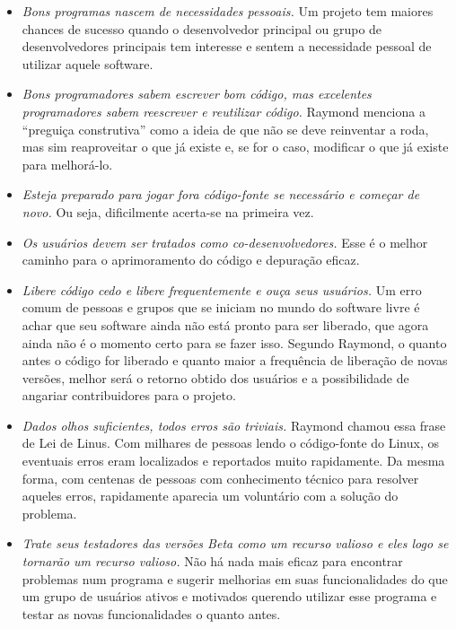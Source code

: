 \begin{itemize}

\item \emph{Bons programas nascem de necessidades pessoais.} Um projeto tem maiores chances de sucesso
    quando o desenvolvedor principal ou grupo de desenvolvedores principais tem interesse e sentem
    a necessidade pessoal de utilizar aquele software.

\item \emph{Bons programadores sabem escrever bom código, mas excelentes
    programadores sabem reescrever e reutilizar código.} Raymond menciona a ``preguiça construtiva''
    como a ideia de que não se deve reinventar a roda, mas sim reaproveitar o que já existe e,
    se for o caso, modificar o que já existe para melhorá-lo.

\item \emph{Esteja preparado para jogar fora código-fonte se necessário e começar de novo.} 
	Ou seja, dificilmente acerta-se na primeira vez.

\item \emph{Os usuários devem ser tratados como co-desenvolvedores.} Esse é o melhor caminho para 
    o aprimoramento do código e depuração eficaz.

\item \emph{Libere código cedo e libere frequentemente e ouça seus usuários.}
	Um erro comum de pessoas e grupos que se 
	iniciam no mundo do software livre é achar que seu software ainda não está pronto para ser
	liberado, que agora ainda não é o momento certo para se fazer isso. Segundo Raymond, o quanto
	antes o código for liberado e quanto maior a frequência de liberação de novas versões, melhor
	será o retorno obtido dos usuários e a possibilidade de angariar contribuidores para o projeto.

\item \emph{Dados olhos suficientes, todos erros são triviais.} Raymond chamou essa frase de Lei de Linus.
    Com milhares de pessoas lendo o código-fonte do Linux, os eventuais erros eram localizados e
    reportados muito rapidamente. Da mesma forma, com centenas de pessoas com conhecimento técnico
    para resolver aqueles erros, rapidamente aparecia um voluntário com a solução do problema.

\item \emph{Trate seus testadores das versões Beta como um recurso valioso e eles logo se tornarão
	um recurso valioso.} Não há nada mais eficaz para encontrar problemas num programa e sugerir
	melhorias em suas funcionalidades do que um grupo de usuários ativos e motivados querendo utilizar
	esse programa e testar as novas funcionalidades o quanto antes.


\end{itemize}
